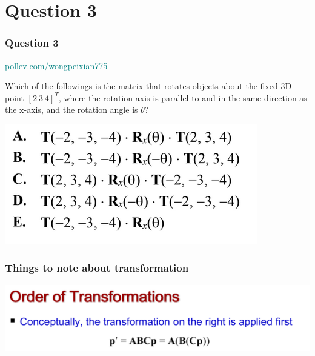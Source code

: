 \documentclass{beamer}
\begin{document}
\section{Question 3}

\begin{frame}
    \frametitle{Question 3}

    \begin{tcolorbox}[colback=teal!5!white]
        \textcolor{teal}{pollev.com/wongpeixian775}
    \end{tcolorbox}

    Which of the followings is the matrix that rotates objects about the fixed 3D point 
    $[2 \  3 \  4]^T$, where the rotation axis is parallel to and in the same direction 
    as the x-axis, and the rotation angle is $\theta$? 

    \begin{center}
        \includegraphics[scale=0.8]{q3-options.png}
    \end{center}

\end{frame}

\begin{frame}
    \frametitle{Things to note about transformation}


    \begin{center}
        \includegraphics[scale=0.4]{order-of-trans.png}
    \end{center}

\end{frame}
\end{document}

